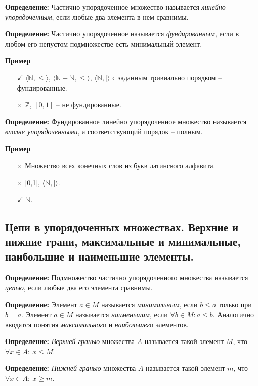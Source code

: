 \textbf{Определение:} Частично упорядоченное множество называется \textit{линейно упорядоченным}, если любые два элемента в нем сравнимы.

\textbf{Определение:} Частично упорядоченное называется \textit{фундированным}, если в любом его непустом подмножестве есть минимальный элемент.

\textbf{Пример}
\begin{itemize}
    \item [$\checkmark$] $\langle\mathbb{N}, \leq\rangle$, $\langle\mathbb{N} + \mathbb{N}, \leq\rangle$, $\langle\mathbb{N},|\rangle$ с заданным тривиально порядком -- фундированные.
    \item [$\times$] $\mathbb{Z}$, $[0,1]$ -- не фундированные.
\end{itemize}

\textbf{Определение:} Фундированное линейно упорядоченное множество называется \textit{вполне упорядоченными}, а соответствующий порядок -- полным.

\textbf{Пример}
\begin{itemize}
    \item [$\times$ ] Множество всех конечных слов из букв латинского алфавита.
    \item [$\times$ ] [0,1], $\langle \mathbb{N},|\rangle$.
    \item [$\checkmark$ ] $\mathbb{N}$.
\end{itemize}

\subsection{Цепи в упорядоченных множествах. Верхние и нижние грани, максимальные и минимальные, наибольшие и наименьшие элементы.}

\textbf{Определение:} Подмножество частично упорядоченного множества называется \textit{цепью}, если любые два его элемента сравнимы.

\textbf{Определение:} Элемент $a \in M$ называется \textit{минимальным}, если $b \leq a$ только при $b = a$. Элемент $a \in M$ называется \textit{наименьшим}, если $\forall b\in M: a \leq b$.
Аналогично вводятся понятия \textit{максимального} и \textit{наибольшего} элементов.

\textbf{Определение:} \textit{Верхней гранью} множества $A$ называется такой элемент $M$, что $\forall x \in A: \ x\leq M$.

\textbf{Определение:} \textit{Нижней гранью} множества $A$ называется такой элемент $m$, что $\forall x \in A: \ x\geq m$.

